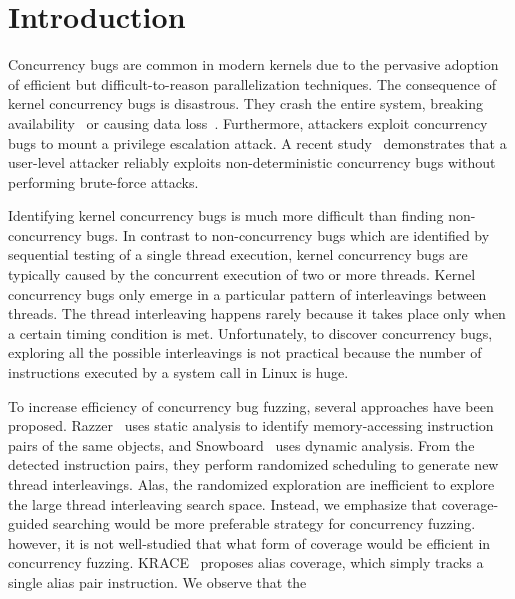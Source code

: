 \section{Introduction}
\label{s:intro}


Concurrency bugs are common in modern kernels due to 
the pervasive adoption of efficient but difficult-to-reason
parallelization techniques.
The consequence of kernel concurrency bugs is disastrous. They crash
the entire system, breaking availability~\cite{cve201812232, snowboardbug} or causing data loss~\cite{dataloss}.
Furthermore, attackers 
exploit concurrency bugs to mount a privilege escalation attack.
A recent study~\cite{exprace} demonstrates that a user-level attacker 
reliably exploits non-deterministic concurrency bugs without performing
brute-force attacks.

Identifying kernel concurrency bugs is much more difficult than 
finding non-concurrency bugs. 
In contrast to non-concurrency bugs which are identified by 
sequential testing of a single thread execution,
kernel concurrency bugs are typically caused by the concurrent execution 
of two or more threads.
Kernel concurrency bugs only emerge in a particular pattern of 
interleavings between threads. The thread interleaving happens 
rarely because it takes place only when a certain timing condition is met.
Unfortunately, to discover concurrency bugs, exploring all the possible interleavings is not practical because 
the number of instructions executed by a system call in Linux is huge.

To increase efficiency of concurrency bug fuzzing, several approaches
have been proposed.  Razzer~\cite{razzer} uses static analysis to 
identify memory-accessing instruction pairs of the same objects, and 
Snowboard~\cite{snowboard} uses dynamic analysis. 
From the detected instruction pairs, they perform randomized 
scheduling to generate new thread interleavings. Alas,
the randomized exploration are inefficient to explore the large 
thread interleaving search space. Instead, we emphasize that 
coverage-guided searching would be more preferable strategy 
for concurrency fuzzing. however, it is not well-studied that 
what form of coverage would be efficient in concurrency fuzzing.
KRACE~\cite{krace} proposes alias coverage, which simply tracks 
a single alias pair instruction. We observe that the


